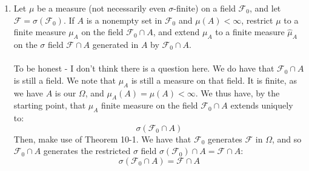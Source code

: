 \documentclass[12pt,a4paper]{article}
\newcommand{\1}[1]{\mathbbm{1}\left\{ #1 \right\}}
\newcommand{\fcal}{\mathcal{F}}
\begin{document}
\begin{enumerate}
	\item Let $\mu$ be a measure (not necessarily even $\sigma$-finite) on a field $\fcal_0$, and let $\fcal = \sigma(\fcal_0)$. If $A$ is a nonempty set in $\fcal_0$ and $\mu(A) < \infty$, restrict $\mu$ to a finite measure $\mu_A$ on the field $\fcal_0 \cap A$, and extend $\mu_A$ to a finite measure $\hat{\mu}_A$ on the $\sigma$ field $\fcal \cap A$ generated in $A$ by $\fcal_0 \cap A$.
	\\\\
	To be honest - I don't think there is a question here. We do have that $\fcal_0 \cap A$ is still a field. We note that $\mu_A$ is still a measure on that field. It is finite, as we have $A$ is our $\Omega$, and $\mu_A(A) = \mu(A) < \infty$. We thus have, by the starting point, that $\mu_A$ finite measure on the field $\fcal_0 \cap A$ extends uniquely to:
	$$
		\sigma(\fcal_0 \cap A)
	$$
	Then, make use of Theorem 10-1. We have that $\fcal_0$ generates $\fcal$ in $\Omega$, and so $\fcal_0 \cap A$ generates the restricted $\sigma$ field $\sigma(\fcal_0) \cap A = \fcal \cap A$:
	$$
		\sigma(\fcal_0 \cap A) = \fcal \cap A
	$$
	

\end{enumerate}
\end{document}
